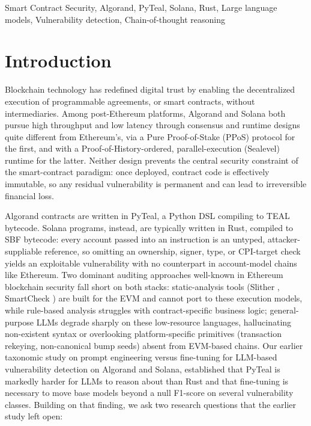 \documentclass[lettersize,journal]{IEEEtran}
\begin{document}
\begin{IEEEkeywords}
Smart Contract Security, Algorand, PyTeal, Solana, Rust, Large language models, Vulnerability
detection, Chain-of-thought reasoning
\end{IEEEkeywords}

\section{Introduction}
\label{sec:intro}

Blockchain technology has redefined digital trust by enabling the decentralized execution of 
programmable agreements, or smart contracts, without intermediaries. Among post-Ethereum platforms, 
Algorand and Solana both pursue high throughput and low latency through consensus and runtime
designs quite
different from Ethereum's, via a Pure Proof-of-Stake (PPoS) protocol for the first, and with a
Proof-of-History-ordered, parallel-execution (Sealevel) runtime for the latter.
Neither design prevents the central security constraint of the smart-contract paradigm: once
deployed, contract code is effectively immutable, so any residual vulnerability is permanent 
and can lead to irreversible financial loss.

Algorand contracts are written in PyTeal, a Python DSL 
compiling to TEAL bytecode. Solana programs, instead, are typically 
written in Rust, compiled to SBF bytecode: every account passed 
into an instruction is an untyped, attacker-suppliable reference, so omitting an ownership, 
signer, type, or CPI-target check yields an exploitable vulnerability with no counterpart 
in account-model chains like Ethereum. Two dominant auditing approaches well-known in Ethereum
blockchain security fall short on both stacks: static-analysis tools (Slither
\cite{feist2019slither},
SmartCheck \cite{tikhomirov2018smartcheck}) are built 
for the EVM and cannot port to these execution models, while rule-based analysis 
struggles with contract-specific business logic; general-purpose LLMs degrade sharply on 
these low-resource languages, hallucinating non-existent syntax or overlooking 
platform-specific primitives (transaction rekeying, non-canonical bump seeds) absent from EVM-based
chains.
Our earlier taxonomic study \cite{boi2025} on prompt engineering versus fine-tuning 
for LLM-based vulnerability detection on Algorand and Solana, established that 
PyTeal is markedly harder for LLMs to reason about than Rust and that 
fine-tuning is necessary to move base models beyond a null F1-score 
on several vulnerability classes. Building on that finding, we ask two research 
questions that the earlier study left open:
\end{document}
